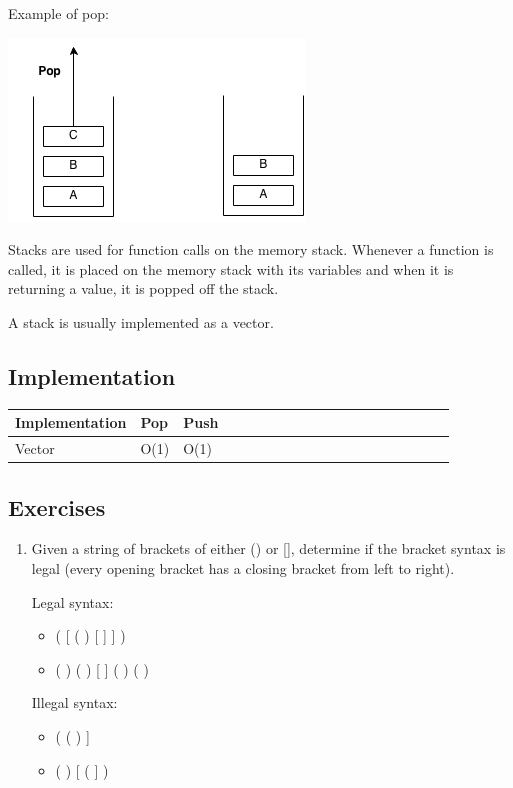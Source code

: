 \documentclass[11pt,oneside]{book}
\makeatletter
\def\maxwidth#1{\ifdim\Gin@nat@width>#1 #1\else\Gin@nat@width\fi}
\makeatother
\begin{document}
Example of pop:

\includegraphics[width=\maxwidth{\textwidth}]{stack2.png}

Stacks are used for function calls on the memory stack. Whenever a function is called, it is placed on the memory stack with its variables and when it is returning a value, it is popped off the stack.

A stack is usually implemented as a vector.

\subsection{Implementation}

\vspace{10pt} \begin{tabulary}{0.4\linewidth}{|l|l|l|l|l|l|l|l|l|l|l|l|l|l|l|l|l|l|l}\hline


  Implementation &
  Pop &
  Push\\
\hline


  Vector &
  O(1) &
  O(1)\\

\hline\end{tabulary}

\subsection{Exercises}

\begin{enumerate}
\item Given a string of brackets of either () or [], determine if the bracket syntax is legal (every opening bracket has a closing bracket from left to right).

Legal syntax:

\begin{itemize}
\item ( [ ( ) [ ] ] )
\item ( ) ( ) [ ] ( ) ( )
\end{itemize}

Illegal syntax:

\begin{itemize}
\item ( ( ) ]
\item ( ) [ ( ] )
\end{itemize}
\end{enumerate}
\end{document}
